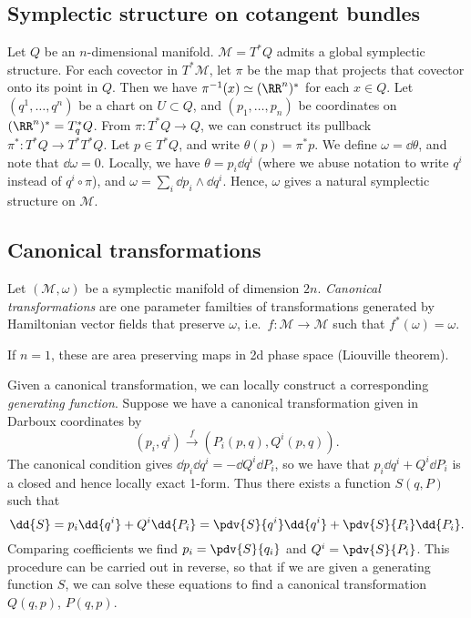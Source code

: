 \documentclass{jknotes}
\begin{document}
\subsection{Symplectic structure on cotangent bundles}
Let \(Q\) be an \(n\)-dimensional manifold. \(\mathcal{M}=T^*Q\) admits a global symplectic structure. For each covector in \(T^*\mathcal{M}\), let \(\pi\) be the map that projects that covector onto its point in \(Q\). Then we have \(\pi^{-1}(x)\simeq(\RR^n)^*\) for each \(x\in Q\). Let \((q^1,\dots,q^n)\) be a chart on \(U\subset Q\), and \((p_1,\dots,p_n)\) be coordinates on \((\RR^n)^*=T_q^*Q\). From \(\pi:T^*Q\to Q\), we can construct its pullback \(\pi^*:T^*Q\to T^*T^*Q\). Let \(p\in T^*Q\), and write \(\theta(p)=\pi^*p\). We define \(\omega=\dd{\theta}\), and note that \(\dd{\omega}=0\). Locally, we have \(\theta = p_i\dd{q^i}\) (where we abuse notation to write \(q^i\) instead of \(q^i\circ \pi\)), and \(\omega=\sum_i\dd{p_i}\wedge\dd{q^i}\). Hence, \(\omega\) gives a natural symplectic structure on \(\mathcal{M}\).

\subsection{Canonical transformations}
Let \((\mathcal{M},\omega)\) be a symplectic manifold of dimension \(2n\). \emph{Canonical transformations} are one parameter familties of transformations generated by Hamiltonian vector fields that preserve \(\omega\), i.e.\ \(f:\mathcal{M}\to\mathcal{M}\) such that \(f^*(\omega)=\omega\).

If \(n=1\), these are area preserving maps in 2d phase space (Liouville theorem).

Given a canonical transformation, we can locally construct a corresponding \emph{generating function}. Suppose we have a canonical transformation given in Darboux coordinates by
\begin{equation}
    (p_i,q^i) \stackrel{f}{\to} (P_i(p,q),Q^i(p,q)).
\end{equation}
The canonical condition gives \(\dd{p_i\dd{q^i}}=-\dd{Q^i\dd{P_i}}\), so we have that \(p_i\dd{q^i}+Q^i\dd{P_i}\) is a closed and hence locally exact 1-form. Thus there exists a function \(S(q,P)\) such that 
\begin{equation}
    \dd{S} = p_i\dd{q^i}+Q^i\dd{P_i} = \pdv{S}{q^i}\dd{q^i} + \pdv{S}{P_i}\dd{P_i}.
\end{equation}
Comparing coefficients we find \(p_i=\pdv{S}{q_i}\) and \(Q^i=\pdv{S}{P_i}\). This procedure can be carried out in reverse, so that if we are given a generating function \(S\), we can solve these equations to find a canonical transformation \(Q(q,p)\), \(P(q,p)\).
\end{document}
